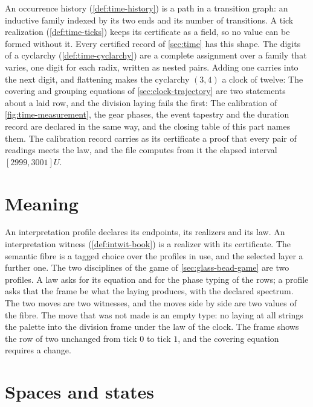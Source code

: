 An occurrence history (\cref{def:time-history}) is a path in a transition
graph: an inductive family indexed by its two ends and its number of
transitions. A tick realization (\cref{def:time-ticks}) keeps its certificate
as a field, so no value can be formed without it. Every certified record of
\cref{sec:time} has this shape.
The digits of a cyclarchy (\cref{def:time-cyclarchy}) are a complete
assignment over a family that varies, one digit for each radix, written as
nested pairs. Adding one carries into the next digit, and flattening makes
the cyclarchy $(3,4)$ a clock of twelve:
The covering and grouping equations of \cref{sec:clock-trajectory} are two
statements about a laid row, and the division laying fails the first:
The calibration of \cref{fig:time-measurement}, the gear phases, the event
tapestry and the duration record are declared in the same way, and the
closing table of this part names them. The calibration record carries as
its certificate a proof that every pair of readings meets the law, and the
file computes from it the elapsed interval $[2999,3001]U$.

\section*{Meaning}
\label{sec:lean-meaning}

An interpretation profile declares its endpoints, its realizers and its law.
An interpretation witness (\cref{def:intwit-book}) is a realizer with its
certificate. The semantic fibre is a tagged choice over the profiles in use,
and the selected layer a further one.
The two disciplines of the game of \cref{sec:glass-bead-game} are two
profiles. A law asks for its equation and for the phase typing of the rows;
a profile asks that the frame be what the laying produces, with the declared
spectrum. The two moves are two witnesses, and the moves side by side are two
values of the fibre. The move that was not made is an empty type: no laying
at all strings the palette into the division frame under the law of the
clock. The frame shows the row of two unchanged from tick $0$ to tick $1$,
and the covering equation requires a change.

\section*{Spaces and states}
\label{sec:lean-space}

